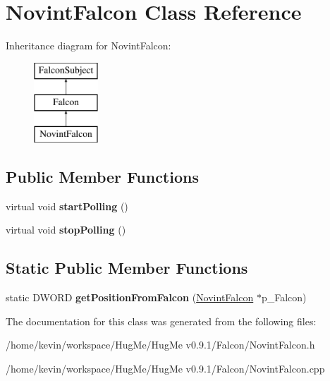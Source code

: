 \hypertarget{classNovintFalcon}{
\section{NovintFalcon Class Reference}
\label{classNovintFalcon}
}
Inheritance diagram for NovintFalcon:\begin{figure}[H]
\begin{center}
\leavevmode
\includegraphics[height=3cm]{classNovintFalcon}
\end{center}
\end{figure}
\subsection*{Public Member Functions}
\begin{DoxyCompactItemize}
\item 
\hypertarget{classNovintFalcon_a3e82b6e9d7c393684b809971208922bf}{
virtual void {\bfseries startPolling} ()}
\label{classNovintFalcon_a3e82b6e9d7c393684b809971208922bf}

\item 
\hypertarget{classNovintFalcon_a3bc94cd6f05df1d327f79fb87001039d}{
virtual void {\bfseries stopPolling} ()}
\label{classNovintFalcon_a3bc94cd6f05df1d327f79fb87001039d}

\end{DoxyCompactItemize}
\subsection*{Static Public Member Functions}
\begin{DoxyCompactItemize}
\item 
\hypertarget{classNovintFalcon_a2825832a87b1005d7b74baff0fd05f55}{
static DWORD {\bfseries getPositionFromFalcon} (\hyperlink{classNovintFalcon}{NovintFalcon} $\ast$p\_\-Falcon)}
\label{classNovintFalcon_a2825832a87b1005d7b74baff0fd05f55}

\end{DoxyCompactItemize}


The documentation for this class was generated from the following files:\begin{DoxyCompactItemize}
\item 
/home/kevin/workspace/HugMe/HugMe v0.9.1/Falcon/NovintFalcon.h\item 
/home/kevin/workspace/HugMe/HugMe v0.9.1/Falcon/NovintFalcon.cpp\end{DoxyCompactItemize}
